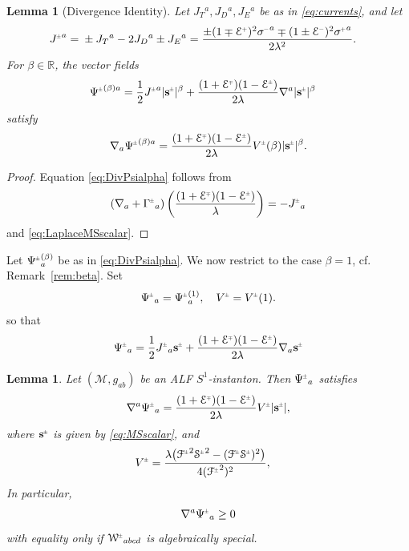 \documentclass[a4paper,10pt,reqno]{amsart}
\newcommand{\Reals}{\mathbb{R}}
\newcommand{\Scal}{\mathop{\rm Scal}}
\newcommand{\cM}{\mathcal{M}}
\theoremstyle{plain}
\newtheorem{lemma}[thm]{Lemma}
\renewcommand{\P}[1]{{{#1}^{\hspace{-.5pt}\scaleto{+}{4pt}}}}
\newcommand{\M}[1]{{{#1}^{\hspace{-.5pt}\scaleto{-}{4pt}}}}
\newcommand{\PM}[1]{{{#1}^{\hspace{-.5pt}\scaleto{\pm}{3.5pt}}}}
\newcommand{\MP}[1]{{{#1}^{\hspace{-.5pt}\scaleto{\mp}{3.5pt}}}}
\def\Wcal{\mathcal{W}}
\def\Fcal{\mathcal{F}}
\def\Ecal{\mathcal{E}}
\def\Scal{\mathcal{S}}
\def\sbold{\mathbf{s}}
\numberwithin{equation}{section}
\begin{document}
\begin{lemma}[Divergence Identity]
Let $J_{T}{}^{a}, J_{D}{}^{a}, J_{E}{}^{a}$ be as in \eqref{eq:currents}, and let  
\begin{align} \label{eq:Jcurrdef}
\PM{J}^{a}={}&\pm J_{T}{}^{a}  - 2 J_{D}{}^{a} \pm J_{E}{}^{a}
 = \frac{\pm (1 \mp \P{\Ecal})^2 \M{\sigma}^{a} \mp  (1 \pm \M{\Ecal})^2 \P{\sigma}^{a}}{2 \lambda^2}.
\end{align} 
For $\beta \in \Reals$,  the vector fields
\begin{align}
\PM{\Psi}^{(\beta)a}={}& \frac{1}{2} \PM{J}^{a} |\PM{\sbold}|^\beta
+ \frac{(1+\MP{\Ecal})(1-\PM{\Ecal})}{2\lambda}\nabla^{a}|\PM{\sbold}|^\beta
\end{align}
satisfy
\begin{align} \label{eq:DivPsialpha}
\nabla_a \PM{\Psi}^{(\beta)a} = \frac{(1 + \MP{\Ecal}) (1 -  \PM{\Ecal})}{2\lambda} \PM{V}(\beta) |\PM{\sbold}|^\beta.
\end{align}
\end{lemma}
\begin{proof}
Equation \eqref{eq:DivPsialpha} follows from 
\begin{align}
\left( \nabla_a + \PM{\Gamma}_a \right) \left( \frac{(1+\MP{\Ecal})(1-\PM{\Ecal})}{\lambda}\right) = - \PM{J}_{a} 
\end{align}
and \eqref{eq:LaplaceMSscalar}.
\end{proof}


%




Let $\PM{\Psi}^{(\beta)}_a$ be as in \eqref{eq:DivPsialpha}. We now restrict to the case $\beta=1$, cf. Remark~\ref{rem:beta}. 
Set  
\begin{align} 
\PM{\Psi}_a  = \PM{\Psi}^{(1)}_a  , \quad \PM{V} = \PM{V}(1) .
\end{align}
so that
\begin{align}  \label{eq:Psi-def} 
\PM{\Psi}_a
= \frac{1}{2}\PM{J}_a \PM{\sbold}
+ \frac{(1+\MP{\Ecal})(1-\PM{\Ecal})}{2\lambda}\nabla_{a} \PM{\sbold}
\end{align}

\begin{lemma} \label{lem:magic}  
Let $(\cM, g_{ab})$ be an ALF $S^1$-instanton. Then $\PM{\Psi}_a$ satisfies
\begin{align} \label{eq:divmagic} 
\nabla^a \PM{\Psi}_a = \frac{(1 + \MP{\Ecal}) (1 -  \PM{\Ecal})}{2\lambda} \PM{V} |\PM{\sbold}| ,
\end{align}
where $\PM{\sbold}$ is given by \eqref{eq:MSscalar}, and 
\begin{align}
\PM{V} ={}& \frac{\lambda \bigl(\PM{\Fcal}^2 \PM{\Scal}^2 - (\PM{\Fcal}\PM{\Scal})^2 \bigr) }{4 (\PM{\Fcal}^2)^2}, \label{eq:Vpm1}
\end{align} 
In particular, 
\begin{align} 
\nabla^a \PM{\Psi}_a \geq 0
\end{align} 
with equality only if $\PM{\Wcal}_{abcd}$ is algebraically special.  
\end{lemma}
\end{document}
